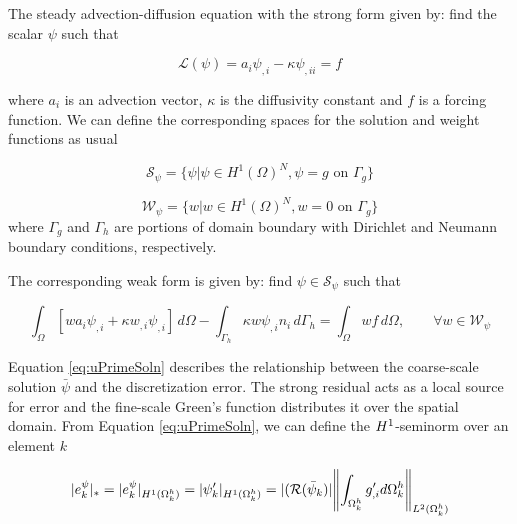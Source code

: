 

The steady advection-diffusion equation with the strong form given by: find the scalar $\psi$ such that

\begin{equation}
\mathcal{L}(\psi) = a_i \psi_{,i} - \kappa \psi_{,ii} = f
\end{equation}

\noindent where $a_i$ is an advection vector, $\kappa$ is the diffusivity constant and $f$
is a forcing function.
We can define the corresponding spaces for the solution and weight functions as usual

\begin{equation}
\label{eq:testspace}
\mathcal{S}_{\psi} = \{ \psi| \psi \in H^1(\Omega)^N, \psi = g \text{ on } \Gamma_g\} 
\end{equation}

\begin{equation}
\label{eq:Vweightspace}
\mathcal{W}_{\psi} = \{ w|w \in H^1(\Omega)^N, w = 0 \text{ on } \Gamma_g\}
\end{equation}
\noindent where $\Gamma_g$ and $\Gamma_h$ are portions of domain boundary with Dirichlet and Neumann boundary conditions, respectively.

\noindent The corresponding weak form is given by: find $\psi \in \mathcal{S}_{\psi}$ such that

\begin{equation} 
\int_\Omega \left[ w a_i \psi_{,i} + \kappa {w}_{,i}\psi_{,i}\right] \, d\Omega- 
\int_{\Gamma_h} \kappa w \psi_{,i} n_i\, d\Gamma_h = 
\int_\Omega w f \, d\Omega, \qquad \forall w \in \mathcal{W}_{\psi}
\label{eq:AD_model}
\end{equation}

Equation \ref{eq:uPrimeSoln} describes the relationship between the coarse-scale solution $\bar{\psi}$ and the discretization error.
The strong residual acts as a local source for error and the fine-scale Green's function distributes it over the spatial domain.
From Equation \ref{eq:uPrimeSoln}, we can define the $H^{1}$-seminorm over an element $k$

\begin{equation}
    |e^{\psi}_k|_* = |e^{\psi}_k|_{H^{1}(\Omega^h_k)} = |\psi'_k|_{H^{1}(\Omega^h_{k})}= |(\mathcal{R}(\bar{\psi}_k)| \norm{ \int_{\Omega^{h}_{k}} g_{,i}' d\Omega^h_{k}}_{L^2(\Omega^h_k)}
\end{equation}

